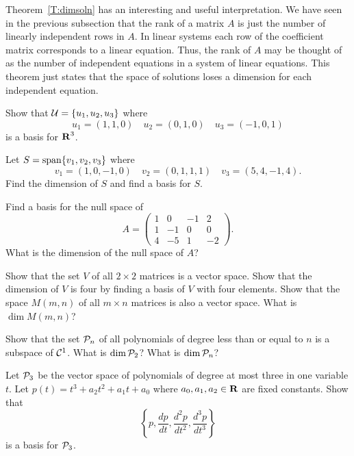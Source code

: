 \documentclass{ximera}
\begin{document}
Theorem~\ref{T:dimsoln} has an interesting and useful interpretation.
We have seen in the previous subsection that the rank of a matrix $A$
is just the number of linearly independent rows in $A$.
In linear systems each row of the coefficient matrix corresponds
to a linear equation.  Thus, the rank of $A$ may be thought of as the
number of independent equations in a system of linear equations.
This theorem just states that the space of solutions loses a dimension
for each independent equation.


\EXER

\TEXER

\begin{exercise} \label{c5.5.1}
Show that ${\cal U}=\{u_1,u_2,u_3\}$ where
\[
u_1=(1,1,0) \quad u_2=(0,1,0) \quad u_3=(-1,0,1)
\]
is a basis for $\mbox{$\bf{R}$}^3$.
\end{exercise}


\begin{exercise} \label{c5.5.2}
Let $S={\rm span}\{v_1,v_2,v_3\}$ where
\[
v_1=(1,0,-1,0) \quad v_2=(0,1,1,1) \quad v_3=(5,4,-1,4).
\]
Find the dimension of $S$ and find a basis for $S$.
\end{exercise}

\begin{exercise} \label{c5.5.3}
Find a basis for the null space of
\[
A =\left(\begin{array}{rrrr} 1 & 0 & -1 & 2\\ 1 & -1 & 0 & 0\\
4 & -5 & 1 & -2 \end{array} \right).
\]
What is the dimension of the null space of $A$?
\end{exercise}

\begin{exercise} \label{c5.5.4}
Show that the set $V$ of all $2\times 2$ matrices is a vector space.
Show that the dimension of $V$ is four by finding a basis of $V$
with four elements.  Show that the space $M(m,n)$ of all $m\times n$
matrices is also a vector space.  What is $\dim M(m,n)$?
\end{exercise}

\begin{exercise} \label{c5.5.5}
Show that the set ${\cal P}_n$ of all polynomials of degree less than
or equal to $n$ is a subspace of ${\cal C}^1$.  What is $\dim {\cal P}_2$?
What is $\dim {\cal P}_n$?
\end{exercise}

\begin{exercise} \label{c5.5.6}
Let ${\cal P}_3$ be the vector space of polynomials of degree at
most three in one variable $t$.  Let $p(t)=t^3+a_2t^2+a_1t+a_0$ where
$a_0,a_1,a_2\in\mbox{$\bf{R}$}$ are fixed constants.  Show that
\[
\left\{ p, \frac{dp}{dt}, \frac{d^2p}{dt^2}, \frac{d^3p}{dt^3}\right\}
\]
is a basis for ${\cal P}_3$.
\end{exercise}
\end{document}
